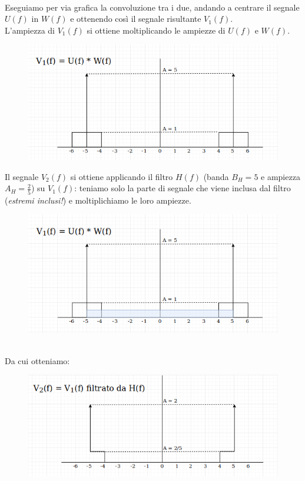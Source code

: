 \documentclass[12pt,a4paper]{article}
\begin{document}
	\\Eseguiamo per via grafica la convoluzione tra i due, andando a centrare il segnale $U(f)$ in $W(f)$ e ottenendo così il segnale risultante $V_1(f)$.\\L'ampiezza di $V_1(f)$ si ottiene moltiplicando le ampiezze di $U(f)$ e $W(f)$.
	\newpage
	\begin{figure}[h!]
		\centering
		\includegraphics[scale=0.4]{./images/fourier23.png}
	\end{figure}
	Il segnale $V_2(f)$ si ottiene applicando il filtro $H(f)$ (banda $B_H = 5$ e ampiezza $A_H = \frac{2}{5}$) su $V_1(f)$: teniamo solo la parte di segnale che viene inclusa dal filtro (\textit{estremi inclusi!}) e moltiplichiamo le loro ampiezze.
	\begin{figure}[h!]
		\centering
		\includegraphics[scale=0.4]{./images/fourier24.png}
	\end{figure}
	\\Da cui otteniamo:
	\begin{figure}[h!]
		\centering
		\includegraphics[scale=0.4]{./images/fourier25.png}
	\end{figure}
\end{document}

